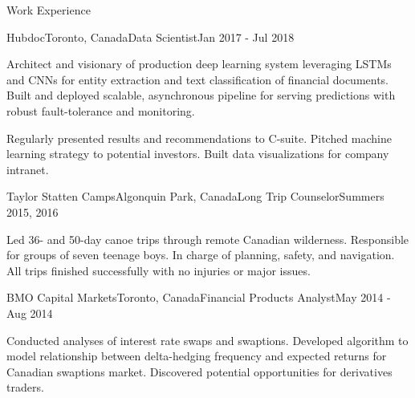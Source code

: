 \documentclass{resume} %
\begin{document}
\begin{rSection}{Work Experience}
\begin{rSubsection}{Hubdoc}{Toronto, Canada}{Data Scientist}{Jan 2017 - Jul 2018}
\item
    Architect and visionary of production deep learning system leveraging LSTMs and CNNs for entity extraction and text classification of financial documents.
    Built and deployed scalable, asynchronous pipeline for serving predictions with robust fault-tolerance and monitoring.

\item
    Regularly presented results and recommendations to C-suite.
    Pitched machine learning strategy to potential investors.
    Built data visualizations for company intranet.

\end{rSubsection}


\begin{rSubsection}{Taylor Statten Camps}{Algonquin Park, Canada}{Long Trip Counselor}{Summers 2015, 2016}

\item
    Led 36- and 50-day canoe trips through remote Canadian wilderness. Responsible for groups of seven teenage boys. In charge of planning,
    safety, and navigation. All trips finished successfully with no injuries or major issues.

\end{rSubsection}


\begin{rSubsection}{BMO Capital Markets}{Toronto, Canada}{Financial Products Analyst}{May 2014 - Aug 2014}

\item
    Conducted analyses of interest rate swaps and swaptions.
    Developed algorithm to model relationship between delta-hedging frequency and expected returns for Canadian swaptions market.
    Discovered potential opportunities for derivatives traders.

\end{rSubsection}


\end{rSection}

\end{document}
